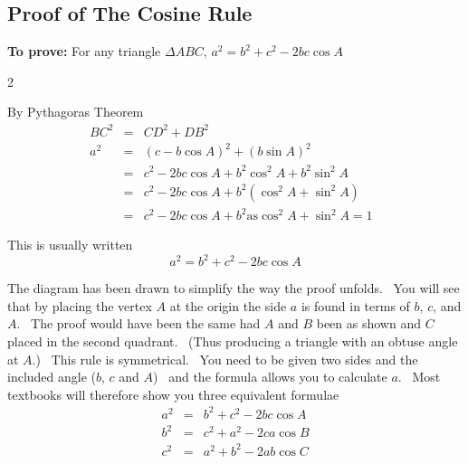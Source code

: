 \subsection{Proof of The Cosine Rule}
\textbf{To prove:} For any triangle $ \Delta A B C\text{,}$ $a^{2} =b^{2} +c^{2} -2 b c \cos  A$  
\columnsep =30pt
\begin {multicols}{2}
 

\vspace{2cm}
\setlength\fboxrule{0in}\setlength\fboxsep{0.2in}
By Pythagoras Theorem
\begin{align*}B C^{2} &  = & C D^{2} +D B^{2} \\
a^{2} &  = & \left (c -b \cos  A\right )^{2} +\left (b \sin  A\right )^{2} \\
 &  = & c^{2} -2 b c \cos  A +b^{2} \cos ^{2} A +b^{2} \sin ^{2} A \\
 &  = & c^{2} -2 b c \cos  A +b^{2} \left (\cos ^{2} A +\sin ^{2} A\right ) \\
 &  = & c^{2} -2 b c \cos  A +b^{2}\text{as}\cos ^{2} A +\sin ^{2} A =1\text{\ }\end{align*} 
\end {multicols}
 

This is usually written
\begin{equation*}a^{2} =b^{2} +c^{2} -2 b c \cos  A
\end{equation*}

The diagram has been drawn to simplify the way the proof unfolds. \ You
will see that by placing the vertex $A$ at the origin the side $a$ is found in terms of $b$, $c$, and $A$. \ The proof would have been the same had $A$ and $B$ been as shown and $C$ placed in the second quadrant. \ (Thus producing a triangle with an obtuse angle at
$A$.) \ This rule is symmetrical. \ You need
to be given two sides and the included angle ($b$, $c$ and $A$) \ and the formula allows you to calculate $a$. \ Most textbooks will therefore show you three equivalent formulae
\begin{align*}a^{2} &  = & b^{2} +c^{2} -2 b c \cos  A \\
b^{2} &  = & c^{2} +a^{2} -2 c a \cos  B \\
c^{2} &  = & a^{2} +b^{2} -2 a b \cos  C\end{align*}

